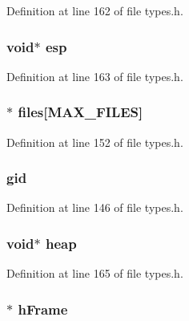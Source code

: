 Definition at line 162 of file types.h.

\hypertarget{structprocess__t_a9a4b64202371e10f27f3769b73537182}{
\subsubsection[{esp}]{\setlength{\rightskip}{0pt plus 5cm}void$\ast$ {\bf esp}}}
\label{structprocess__t_a9a4b64202371e10f27f3769b73537182}


Definition at line 163 of file types.h.

\hypertarget{structprocess__t_a38a7314b52579446f9acf4f643084465}{
\subsubsection[{files}]{$\ast$ {\bf files}\mbox{[}MAX\_\-FILES\mbox{]}}}
\label{structprocess__t_a38a7314b52579446f9acf4f643084465}


Definition at line 152 of file types.h.

\hypertarget{structprocess__t_a788cbd0bbce27a8718e41d5b21806891}{
\subsubsection[{gid}]{ {\bf gid}}}
\label{structprocess__t_a788cbd0bbce27a8718e41d5b21806891}


Definition at line 146 of file types.h.

\hypertarget{structprocess__t_a04510901b878d0d366fb541f823df97d}{
\subsubsection[{heap}]{\setlength{\rightskip}{0pt plus 5cm}void$\ast$ {\bf heap}}}
\label{structprocess__t_a04510901b878d0d366fb541f823df97d}


Definition at line 165 of file types.h.

\hypertarget{structprocess__t_a597f5bd642c4a5d073a48ddd37ed0458}{
\subsubsection[{hFrame}]{$\ast$ {\bf hFrame}}}
\label{structprocess__t_a597f5bd642c4a5d073a48ddd37ed0458}


